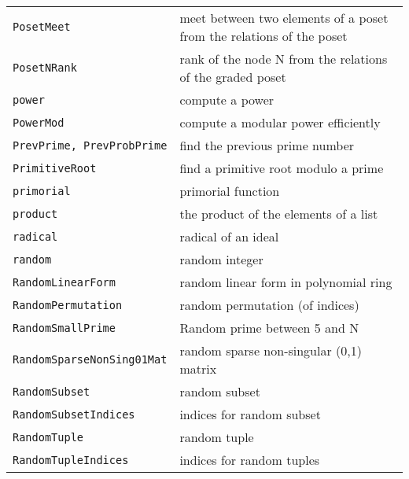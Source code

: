 \documentclass[a4paper]{mybook}
\begin{document}
\begin{center}
\begin{longtable}{ll}
{\verb~PosetMeet~} &
      meet between two elements of a poset from the relations of the poset\\
   
{\verb~PosetNRank~} &
      rank of the node N from the relations of the graded poset\\
   
{\verb~power~} &
      compute a power\\
   
{\verb~PowerMod~} &
      compute a modular power efficiently\\
   
{\verb~PrevPrime, PrevProbPrime~} &
      find the previous prime number\\
   
{\verb~PrimitiveRoot~} &
      find a primitive root modulo a prime\\
   
{\verb~primorial~} &
      primorial function\\
   
{\verb~product~} &
      the product of the elements of a list\\
   
{\verb~radical~} &
      radical of an ideal\\
   
{\verb~random~} &
      random integer\\
   
{\verb~RandomLinearForm~} &
      random linear form in polynomial ring\\
   
{\verb~RandomPermutation~} &
      random permutation (of indices)\\
   
{\verb~RandomSmallPrime~} &
      Random prime between 5 and N\\
   
{\verb~RandomSparseNonSing01Mat~} &
      random sparse non-singular (0,1) matrix\\
   
{\verb~RandomSubset~} &
      random subset\\
   
{\verb~RandomSubsetIndices~} &
      indices for random subset\\
   
{\verb~RandomTuple~} &
      random tuple\\
   
{\verb~RandomTupleIndices~} &
      indices for random tuples\\
   

\end{longtable}
\end{center}
\end{document}
